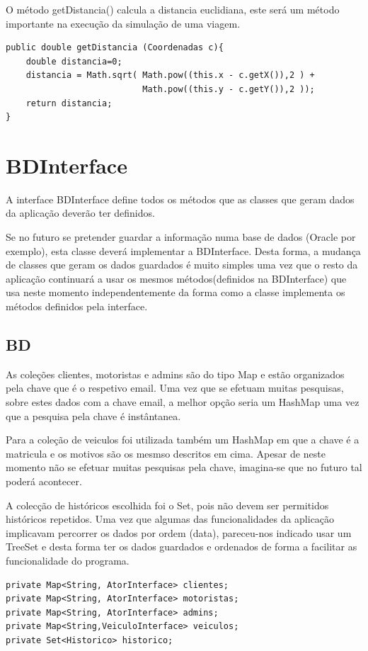 O método getDistancia() calcula a distancia euclidiana, este será um método importante na execução da simulação de uma viagem. 
\begin{verbatim}
public double getDistancia (Coordenadas c){
    double distancia=0; 
    distancia = Math.sqrt( Math.pow((this.x - c.getX()),2 ) +
                           Math.pow((this.y - c.getY()),2 ));
    return distancia; 
}
\end{verbatim}

\section{BDInterface}
A interface BDInterface define todos os métodos que as classes que geram dados da aplicação deverão ter definidos. 

Se no futuro se pretender guardar a informação numa base de dados (Oracle por exemplo), esta classe deverá implementar a BDInterface. Desta forma, a mudança de classes que geram os dados guardados é muito simples uma vez que o resto da aplicação continuará a usar os mesmos métodos(definidos na BDInterface) que usa neste momento independentemente da forma como a classe implementa os métodos definidos pela interface. 

\subsection{BD}

As coleções clientes, motoristas e admins são do tipo Map e estão organizados pela chave que é o respetivo email. Uma vez que se efetuam muitas pesquisas, sobre estes dados com a chave email, a melhor opção seria um HashMap uma vez que a pesquisa pela chave é instântanea. 

Para a coleção de veiculos foi utilizada também um HashMap em que a chave é a matricula e os motivos são os mesmso descritos em cima.  Apesar de neste momento não se efetuar muitas pesquisas pela chave, imagina-se que no futuro tal poderá acontecer. 

A colecção de históricos escolhida foi o Set, pois não devem ser permitidos históricos repetidos. Uma vez que algumas das funcionalidades da aplicação implicavam percorrer os dados por ordem (data), pareceu-nos indicado usar um TreeSet e desta forma ter os dados guardados e ordenados de forma a facilitar as funcionalidade do programa.  

\begin{verbatim}
private Map<String, AtorInterface> clientes;
private Map<String, AtorInterface> motoristas; 
private Map<String, AtorInterface> admins; 
private Map<String,VeiculoInterface> veiculos; 
private Set<Historico> historico;
\end{verbatim}

